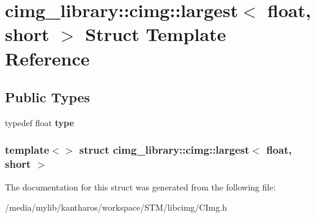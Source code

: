 \hypertarget{structcimg__library_1_1cimg_1_1largest_3_01float_00_01short_01_4}{
\section{cimg\_\-library::cimg::largest$<$ float, short $>$ Struct Template Reference}
\label{structcimg__library_1_1cimg_1_1largest_3_01float_00_01short_01_4}
}
\subsection*{Public Types}
\begin{DoxyCompactItemize}
\item 
\hypertarget{structcimg__library_1_1cimg_1_1largest_3_01float_00_01short_01_4_a65a6b2ad1fba632ae7419929f20aacd2}{
typedef float {\bfseries type}}
\label{structcimg__library_1_1cimg_1_1largest_3_01float_00_01short_01_4_a65a6b2ad1fba632ae7419929f20aacd2}

\end{DoxyCompactItemize}
\subsubsection*{template$<$$>$ struct cimg\_\-library::cimg::largest$<$ float, short $>$}



The documentation for this struct was generated from the following file:\begin{DoxyCompactItemize}
\item 
/media/mylib/kantharos/workspace/STM/libcimg/CImg.h\end{DoxyCompactItemize}
